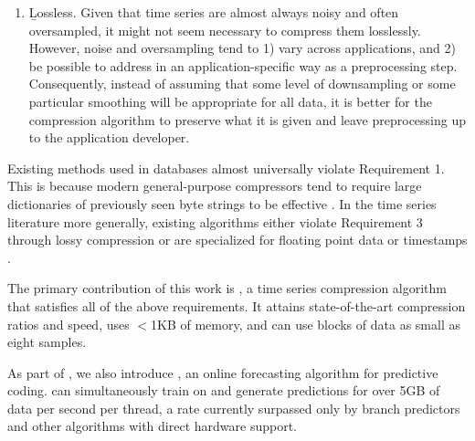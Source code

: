 \begin{enumerate}
\item \b{Lossless}. Given that time series are almost always noisy and often oversampled, it might not seem necessary to compress them losslessly. However, noise and oversampling tend to 1) vary across applications, and 2) be possible to address in an application-specific way as a preprocessing step. Consequently, instead of assuming that some level of downsampling or some particular smoothing will be appropriate for all data, it is better for the compression algorithm to preserve what it is given and leave preprocessing up to the application developer.
\end{enumerate}

Existing methods used in databases almost universally violate Requirement 1. This is because modern general-purpose compressors tend to require large dictionaries of previously seen byte strings to be effective \cite{lz4, snappy, gzip, zlib}. In the time series literature more generally, existing algorithms either violate Requirement 3 through lossy compression \cite{SAX, tsCompressSmartGrid, ecgCompressLossy, apca, lemireSegmentation} or are specialized for floating point data \cite{gorilla} or timestamps \cite{gorilla, berkeleyTreeDB, FastPFOR}.

The primary contribution of this work is \mine,
a time series compression algorithm that satisfies all of the above requirements. It attains state-of-the-art compression ratios and speed, uses $<$1KB of memory, and can use blocks of data as small as eight samples.

As part of \mine, we also introduce \fire,
an online forecasting algorithm for predictive coding. \fire can simultaneously train on and generate predictions for over 5GB of data per second per thread, a rate currently surpassed only by branch predictors and other algorithms with direct hardware support. %



